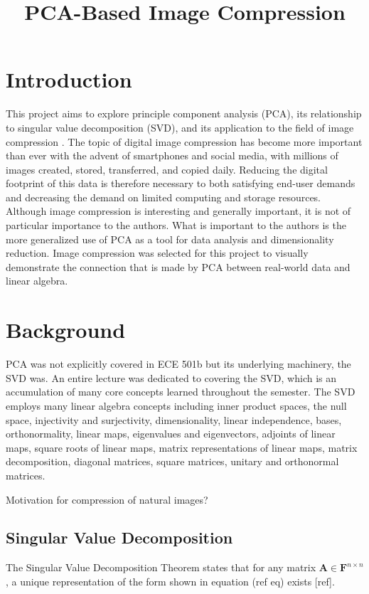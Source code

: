 \documentclass[conference]{IEEEtran}
\title{PCA-Based Image Compression}
\author{
\IEEEauthorblockN{Owen Sowatzke}
\IEEEauthorblockA{\textit{Electrical Engineering Department} \\
\textit{University of Arizona}\\
Tucson, USA \\
osowatzke@arizona.edu}
\and
\IEEEauthorblockN{Scott Thoesen}
\IEEEauthorblockA{\textit{Electrical Engineering Department} \\
\textit{University of Arizona}\\
Tucson, USA \\
thoesens@arizona.edu}}
\begin{document}
    \maketitle
		
    \section{Introduction}
    This project aims to explore principle component analysis (PCA), its relationship to singular value decomposition (SVD), and its application to the field of image compression \cite{jaradet_svd_image_compression}. The topic of digital image compression has become more important than ever with the advent of smartphones and social media, with millions of images created, stored, transferred, and copied daily. Reducing the digital footprint of this data is therefore necessary to both satisfying end-user demands and decreasing the demand on limited computing and storage resources. Although image compression is interesting and generally important, it is not of particular importance to the authors. What is important to the authors is the more generalized use of PCA as a tool for data analysis and dimensionality reduction. Image compression was selected for this project to visually demonstrate the connection that is made by PCA between real-world data and linear algebra.

    \section{Background}
    PCA was not explicitly covered in ECE 501b but its underlying machinery, the SVD was. An entire lecture was dedicated to covering the SVD, which is an accumulation of many core concepts learned throughout the semester. The SVD employs many linear algebra concepts including inner product spaces, the null space, injectivity and surjectivity, dimensionality, linear independence, bases, orthonormality, linear maps, eigenvalues and eigenvectors, adjoints of linear maps, square roots of linear maps, matrix representations of linear maps, matrix decomposition, diagonal matrices, square matrices, unitary and orthonormal matrices.

    Motivation for compression of natural images?


    \subsection{Singular Value Decomposition}
    The Singular Value Decomposition Theorem states that for any matrix $\mathbf{A} \in \mathbf{F}^{n \times n}$, a unique representation of the form shown in equation (ref eq) exists [ref].
\end{document}
